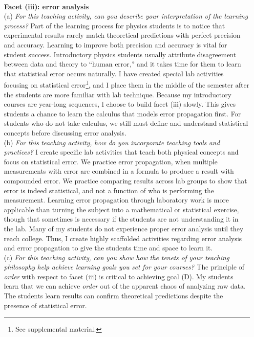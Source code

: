 \documentclass[../../../main.tex]{subfiles}
\begin{document}
\\
\vspace{0.15cm}
\textbf{Facet (iii): error analysis}
\\
\vspace{0.15cm}
(a) \textit{For this teaching activity, can you describe your interpretation of the learning process?}  Part of the learning process for physics students is to notice that experimental results rarely match theoretical predictions with perfect precision and accuracy.  Learning to improve both precision and accuracy is vital for student success.  Introductory physics students usually attribute disagreement between data and theory to ``human error,'' and it takes time for them to learn that statistical error occurs naturally.  I have created special lab activities focusing on statistical error\footnote{See supplemental material.}, and I place them in the middle of the semester after the students are more familiar with lab technique. Because my introductory courses are year-long sequences, I choose to build facet (iii) slowly.  This gives students a chance to learn the calculus that models error propagation first.  For students who do not take calculus, we still must define and understand statistical concepts before discussing error analysis.
\\
\vspace{0.15cm}
(b) \textit{For this teaching activity, how do you incorporate teaching tools and practices?}  I create specific lab activities that teach both physical concepts and focus on statistical error.  We practice error propagation, when multiple measurements with error are combined in a formula to produce a result with compounded error.  We practice comparing results across lab groups to show that error is indeed statistical, and not a function of who is performing the measurement.  Learning error propagation through laboratory work is more applicable than turning the subject into a mathematical or statistical exercise, though that sometimes is necessary if the students are not understanding it in the lab.  Many of my students do not experience proper error analysis until they reach college.  Thus, I create highly scaffolded activities regarding error analysis and error propagation to give the students time and space to learn it.
\\
\vspace{0.15cm}
(c) \textit{For this teaching activity, can you show how the tenets of your teaching philosophy help achieve learning goals you set for your courses?}  The principle of \textit{order} with respect to facet (iii) is critical to achieving goal (D).  My students learn that we can achieve \textit{order} out of the apparent chaos of analyzing raw data.  The students learn results can confirm theoretical predictions despite the presence of statistical error.
\end{document}
